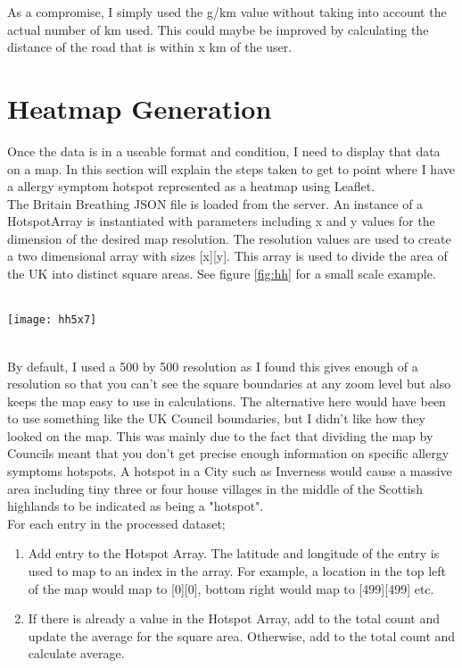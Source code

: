 As a compromise, I simply used the g/km value without taking into account the actual number of km used. This could maybe be improved by calculating the distance of the road that is within x km of the user.

\section{Heatmap Generation}

Once the data is in a useable format and condition, I need to display that data on a map. In this section will explain the steps taken to get to point where I have a allergy symptom hotspot represented as a heatmap using Leaflet.\\

The Britain Breathing JSON file is loaded from the server. An instance of a HotspotArray is instantiated with parameters including x and y values for the dimension of the desired map resolution. The resolution values are used to create a two dimensional array with sizes [x][y]. This array is used to divide the area of the UK into distinct square areas. See figure \ref{fig:hh} for a small scale example.

\begin{SCfigure}
\label{fig:hh}
\caption{Figure \ref{fig:hh} : A [5][7] resolution example}\\
\centering
\texttt{[image: hh5x7]}
\centering
\end{SCfigure}\\

By default, I used a 500 by 500 resolution as I found this gives enough of a resolution so that you can't see the square boundaries at any zoom level but also keeps the map easy to use in calculations. The alternative here would have been to use something like the UK Council boundaries, but I didn't like how they looked on the map. This was mainly due to the fact that dividing the map by Councils meant that you don't get precise enough information on specific allergy symptoms hotspots. A hotspot in a City such as Inverness would cause a massive area including tiny three or four house villages in the middle of the Scottish highlands to be indicated as being a "hotspot".\\

For each entry in the processed dataset;

\begin{enumerate}
    \item Add entry to the Hotspot Array. The latitude and longitude of the entry is used to map to an index in the array. For example, a location in the top left of the map would map to [0][0], bottom right would map to [499][499] etc. 
    \item If there is already a value in the Hotspot Array, add to the total count and update the average for the square area. Otherwise, add to the total count and calculate average.
\end{enumerate}

